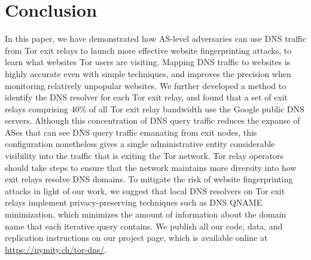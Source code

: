 \section{Conclusion}
\label{sec:conclusion}

In this paper, we have demonstrated how AS-level adversaries can use DNS traffic
from Tor exit relays to launch more effective website fingerprinting attacks, to
learn what websites Tor users are visiting.  Mapping DNS traffic to websites is
highly accurate even with simple techniques, and improves the precision when
monitoring relatively unpopular websites.  We further developed a method to
identify the DNS resolver for each Tor exit relay, and found that a set of exit
relays comprising 40\% of all Tor exit relay bandwidth use the Google public DNS
servers.  Although this concentration of DNS query traffic reduces the expanse
of ASes that can see DNS query traffic emanating from exit nodes, this
configuration nonetheless gives a single administrative entity considerable
visibility into the traffic that is exiting the Tor network. Tor relay operators
should take steps to ensure that the network maintains more diversity into how
exit relays resolve DNS domains.  To mitigate the risk of website fingerprinting
attacks in light of our work, we suggest that local DNS resolvers on Tor exit
relays implement privacy-preserving techniques such as DNS QNAME minimization,
which minimizes the amount of information about the domain name that each
iterative query contains.  We publish all our code, data, and replication
instructions on our project page, which is available online at
\url{https://nymity.ch/tor-dns/}.
